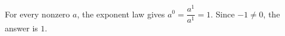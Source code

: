 For every nonzero $a$, the exponent law gives $a^0=\dfrac{a^1}{a^1}=1$. Since $-1\ne0$, the answer is $\boxed{1}$.
